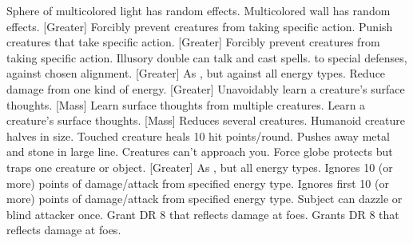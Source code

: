     {Sphere of multicolored light has random effects.}
    {Multicolored wall has random effects.}
    {}
[Greater]
    {Forcibly prevent creatures from taking specific action.}
    {Punish creatures that take specific action.}
    {[Greater] Forcibly prevent creatures from taking specific action.}
    {Illusory double can talk and cast spells.}
    { to special defenses,  against chosen alignment.}
[Greater]
    {As , but against all energy types.}
    {Reduce damage from one kind of energy.}
[Greater]
    {Unavoidably learn a creature's surface thoughts.}
[Mass]
    {Learn surface thoughts from multiple creatures.}
    {Learn a creature's surface thoughts.}
[Mass]
    {Reduces several creatures.}
    {Humanoid creature halves in size.}
    {Touched creature heals 10 hit points/round.}
    {Pushes away metal and stone in large line.}
    {Creatures can't approach you.}
    {Force globe protects but traps one creature or object.}
[Greater]
    {As , but all energy types.}
    {Ignores 10 (or more) points of damage/attack from specified energy type.}
    {Ignores first 10 (or more) points of damage/attack from specified energy type.}
    {Subject can dazzle or blind attacker once.}
    {Grant DR 8 that reflects damage at foes.}
    {Grants DR 8 that reflects damage at foes.}
